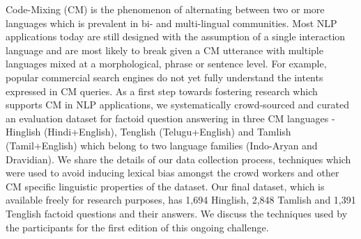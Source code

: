Code-Mixing (CM) is the phenomenon of alternating between two or more languages which is prevalent in bi- and multi-lingual communities. Most NLP applications today are still designed with the assumption of a single interaction language and are most likely to break given a CM utterance with multiple languages mixed at a morphological, phrase or sentence level. For example, popular commercial search engines do not yet fully understand the intents expressed in CM queries. As a first step towards fostering research which supports CM in NLP applications, we systematically crowd-sourced and curated an evaluation dataset for factoid question answering in three CM languages - Hinglish (Hindi+English), Tenglish (Telugu+English) and Tamlish (Tamil+English) which belong to two language families (Indo-Aryan and Dravidian). We share the details of our data collection process, techniques which were used to avoid inducing lexical bias amongst the crowd workers and other CM specific linguistic properties of the dataset. Our final dataset, which is available freely for research purposes, has 1,694 Hinglish, 2,848 Tamlish and 1,391 Tenglish factoid questions and their answers. We discuss the techniques used by the participants for the first edition of this ongoing challenge.
